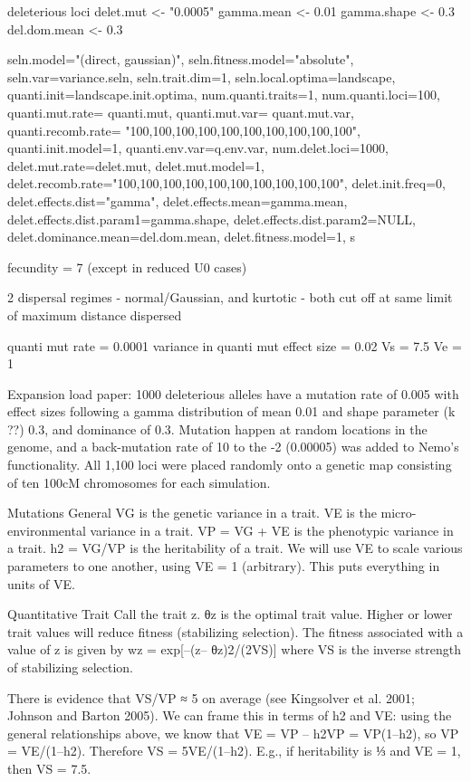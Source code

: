  deleterious loci
delet.mut <- "0.0005"
gamma.mean <- 0.01
gamma.shape <- 0.3
del.dom.mean <- 0.3

 seln.model="(direct, gaussian)", seln.fitness.model="absolute",
	seln.var=variance.seln, seln.trait.dim=1, seln.local.optima=landscape, quanti.init=landscape.init.optima, num.quanti.traits=1,
	num.quanti.loci=100, quanti.mut.rate= quanti.mut, quanti.mut.var= quant.mut.var, quanti.recomb.rate= "{{100,100,100,100,100,100,100,100,100,100}}",
	quanti.init.model=1, quanti.env.var=q.env.var, num.delet.loci=1000, delet.mut.rate=delet.mut,
	delet.mut.model=1, delet.recomb.rate="{{100,100,100,100,100,100,100,100,100,100}}",
	delet.init.freq=0, delet.effects.dist="gamma", delet.effects.mean=gamma.mean, delet.effects.dist.param1=gamma.shape,
	delet.effects.dist.param2=NULL, delet.dominance.mean=del.dom.mean,
	delet.fitness.model=1, s

fecundity = 7 (except in reduced U0 cases)

2 dispersal regimes - normal/Gaussian, and kurtotic - both cut off at same limit of maximum distance dispersed

quanti mut rate = 0.0001
variance in quanti mut effect size = 0.02
Vs = 7.5
Ve = 1


Expansion load paper: 1000 deleterious alleles have a mutation rate of 0.005 with effect sizes 
following a gamma distribution of mean 0.01 and shape parameter (k ??) 0.3, and dominance of 0.3. 
Mutation happen at random locations in the genome, and a back-mutation rate of 10 to the -2 (0.00005) 
was added to Nemo’s functionality. All 1,100 loci were placed randomly onto a genetic map 
consisting of ten 100cM chromosomes for each simulation.

Mutations 
General
VG is the genetic variance in a trait.
VE is the micro-environmental variance in a trait.
VP = VG + VE is the phenotypic variance in a trait.
h2 = VG/VP is the heritability of a trait.
We will use VE to scale various parameters to one another, using VE = 1 (arbitrary). This puts everything in units of VE.
 
Quantitative Trait
Call the trait z. θz is the optimal trait value. Higher or lower trait values will reduce fitness 
(stabilizing selection). The fitness associated with a value of z is given by
wz = exp[–(z– θz)2/(2VS)] 
where VS is the inverse strength of stabilizing selection.
 
There is evidence that VS/VP ≈ 5 on average (see Kingsolver et al. 2001; Johnson and Barton 2005). 
We can frame this in terms of h2 and VE: using the general relationships above, we know that VE = 
VP – h2VP = VP­(1–h2), so VP = VE/(1–h2). Therefore VS = 5VE/(1–h2). E.g., if heritability is ⅓ and 
VE = 1, then VS = 7.5.
 
